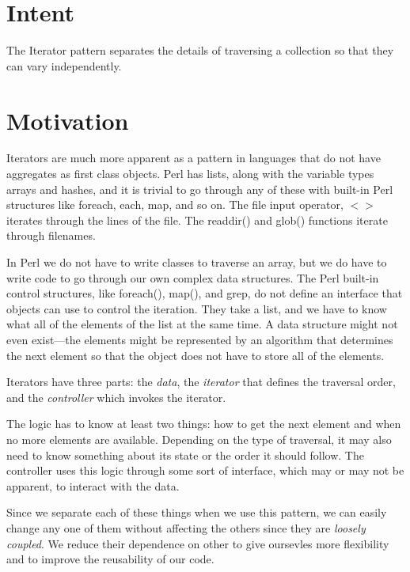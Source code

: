 
    \section{Intent}

The Iterator pattern separates the details of traversing a 
collection so that they can vary independently.

    \section{Motivation}

Iterators are much more apparent as a pattern in languages that do not
have aggregates as first class objects.  Perl has lists, along with
the variable types arrays and hashes, and it is trivial to go through
any of these with built-in Perl structures like foreach, each, map,
and so on.  The file input operator, $<>$ iterates through the lines
of the file. The readdir() and glob() functions iterate through
filenames.

In Perl we do not have to write classes to traverse an array, but we
do have to write code to go through our own complex data structures.
The Perl built-in control structures, like foreach(), map(), and grep,
do not define an interface that objects can use to control the
iteration.  They take a list, and we have to know what all of the
elements of the list at the same time. A data structure might not even
exist---the elements might be represented by an algorithm that
determines the next element so that the object does not have to store
all of the elements.

Iterators have three parts:  the {\it data}, the {\it iterator} that
defines the traversal order, and the {\it controller} which invokes
the iterator.

The logic has to know at least two things:  how to get the next
element and when no more elements are available.  Depending on the
type of traversal, it may also need to know something about its state
or the order it should follow. The controller uses this logic through
some sort of interface, which may or may not be apparent, to interact
with the data.

Since we separate each of these things when we use this pattern, we
can easily change any one of them without affecting the others since
they are {\it loosely coupled}.  We reduce their dependence on other
to give oursevles more flexibility and to improve the reusability of
our code.

